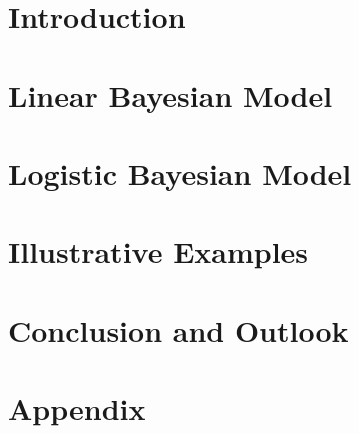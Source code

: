 \documentclass[12pt]{article}
\begin{document}
\newpage
\tableofcontents

\newpage



\section{Introduction}
\label{sec:intro}

\newpage


\section{Linear Bayesian Model}
\label{sec:bayesian_lm}

\newpage

\section{Logistic Bayesian Model}
\label{sec:bayesian_logit}

\newpage

\section{Illustrative Examples}
\label{sec:simulation}

\newpage

\section{Conclusion and Outlook}
\label{sec:conclusion}


\newpage



\setcounter{page}{5} %

\appendix

\section{Appendix}
\label{sec:app}

\newpage
\end{document}
